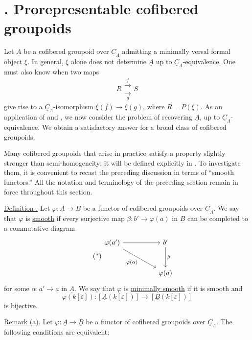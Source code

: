\section*{. Prorepresentable cofibered groupoids}

Let $\underline A$ be a cofibered groupoid over
$\underline C_\Lambda$ admitting a minimally versal formal object
$\xi$. In general, $\xi$ alone does not determine $\underline A$ up
to $\underline C_\Lambda$-equivalence. One must also know when two
maps
\[
 R\mathrel{\substack{\xrightarrow{\ f\ }\\[-.6ex]
                      \xrightarrow[\ g\ ]{}}}S
\]
give rise to a $\underline C_\Lambda$-isomorphism
$\xi(f)\longrightarrow\xi(g)$, where $R=P(\xi)$. As an application
of  and , we now consider the problem of recovering
$\underline A$, up to $\underline C_\Lambda$-equivalence. We obtain
a satisfactory answer for a broad class of cofibered groupoids.


Many cofibered groupoids that arise in practice satisfy a property
slightly stronger than semi-homogeneity; it will be defined
explicitly in . To investigate them, it is convenient to recast
the preceding discussion in terms of ``smooth functors.'' All the
notation and terminology of the preceding section remain in force
throughout this section.

\underline{Definition .} Let
$\varphi:\underline A\longrightarrow\underline B$ be a functor of
cofibered groupoids over $\underline C_\Lambda$. We say that
$\varphi$ is \underline{smooth} if every surjective map
$\beta:b'\longrightarrow\varphi(a)$ in $\underline B$ can be
completed to a commutative diagram
\begin{equation}\tag{*}
\begin{tikzcd}[row sep=large,column sep=huge]
 \varphi(a') \arrow[r] \arrow[dr,"{\varphi(\alpha)}"']
 & b' \arrow[d,"\beta"]\\
 & \varphi(a)
\end{tikzcd}
\end{equation}
for some $\alpha:a'\longrightarrow a$ in $\underline A$. We say
that $\varphi$ is \underline{minimally smooth} if it is smooth and
\[
 \varphi(k[\varepsilon]):
 [\underline A(k[\varepsilon])]
 \longrightarrow
 [\underline B(k[\varepsilon])]
\]
is bijective.

\underline{Remark (a).} Let
$\varphi:\underline A\longrightarrow\underline B$ be a functor of
cofibered groupoids over $\underline C_\Lambda$. The following
conditions are equivalent:

